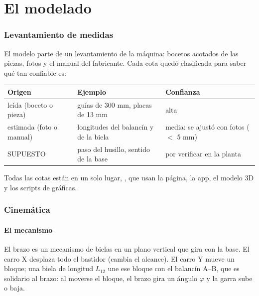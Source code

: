 \documentclass[a4paper,11pt]{article}
\begin{document}
\part{El modelado}

\section{Levantamiento de medidas}
El modelo parte de un levantamiento de la máquina: bocetos acotados de las piezas, fotos y el manual del fabricante. Cada cota quedó clasificada para saber qué tan confiable es:

\begin{center}\small
\begin{tabular}{@{}lll@{}}
\toprule
\textbf{Origen} & \textbf{Ejemplo} & \textbf{Confianza}\\
\midrule
leída (boceto o pieza) & guías de 300 mm, placas de 13 mm & alta\\
estimada (foto o manual) & longitudes del balancín y de la biela & media: se ajustó con fotos ($<$ 5 mm)\\
SUPUESTO & paso del husillo, sentido de la base & por verificar en la planta\\
\bottomrule
\end{tabular}
\end{center}
Todas las cotas están en un solo lugar, , que usan la página, la app, el modelo 3D y los scripts de gráficas.

\section{Cinemática}

\subsection{El mecanismo}
El brazo es un mecanismo de bielas en un plano vertical que gira con la base. El carro X desplaza todo el bastidor (cambia el alcance). El carro Y mueve un bloque; una biela de longitud $L_{12}$ une ese bloque con el balancín A--B, que es solidario al brazo: al moverse el bloque, el brazo gira un ángulo $\varphi$ y la garra sube o baja.
\end{document}
